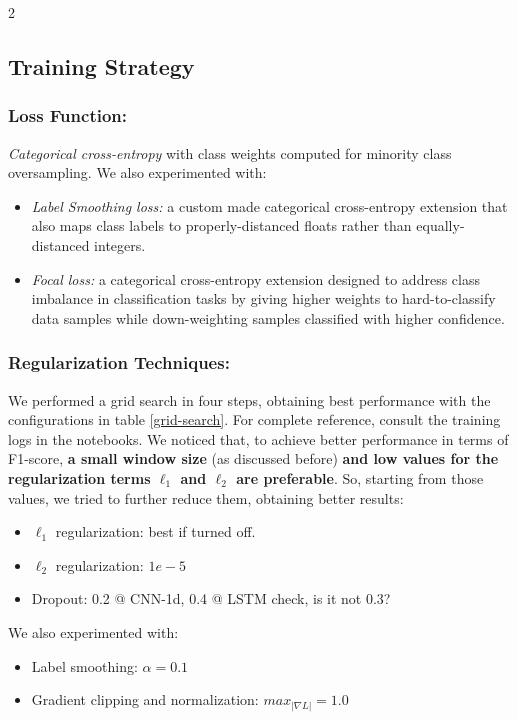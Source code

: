 \documentclass[11pt]{article}
\begin{document}
\begin{multicols}{2}
        \subsection{Training Strategy}
        \subsubsection{Loss Function:}
        \textit{Categorical cross-entropy} with class weights computed for minority class oversampling.
        We also experimented with:
        \begin{itemize}[noitemsep,topsep=0pt]
            \setlength{\itemsep}{1pt}
            \setlength{\parskip}{0pt}
            \setlength{\parsep}{0pt}
            \item  \textit{Label Smoothing loss:} a custom made categorical cross-entropy extension that also maps class labels to properly-distanced floats rather than equally-distanced integers.
            \item \textit{Focal loss:} a categorical cross-entropy extension designed to address class imbalance in classification tasks by giving higher weights to hard-to-classify data samples while down-weighting samples classified with higher confidence. 
        \end{itemize}

        \subsubsection{Regularization Techniques:}
        We performed a grid search in four steps, obtaining  best performance with the configurations in table \ref{grid-search}. For complete reference, consult the training logs in the notebooks. We noticed that, to achieve better performance in terms of F1-score, \textbf{a small window size} (as discussed before) \textbf{and low values for the regularization terms $\ell_1$ and $\ell_2$ are preferable}. So, starting from those values, we tried to further reduce them, obtaining better results:
        \begin{itemize}[noitemsep,topsep=0pt]
            \setlength{\itemsep}{1pt}
            \setlength{\parskip}{0pt}
            \setlength{\parsep}{0pt}
            \item $\ell_1$ regularization: best if turned off.
            \item $\ell_2$ regularization: $1e-5$
            \item Dropout: 0.2 @ CNN-1d, 0.4 @ LSTM \color{red}check, is it not 0.3?\color{black}
        \end{itemize}
        We also experimented with:
        \begin{itemize}[noitemsep,topsep=0pt]
            \setlength{\itemsep}{1pt}
            \setlength{\parskip}{0pt}
            \setlength{\parsep}{0pt}
            \item Label smoothing: $\alpha = 0.1$
            \item Gradient clipping and normalization: $max_{|\nabla L|}=1.0$
        \end{itemize}



\end{multicols}
\end{document}
